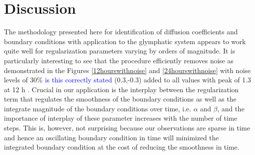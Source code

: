 \documentclass[11pt,a4paper]{article}
\newcommand{\kam}[1]{\textcolor{blue}{#1}}
\begin{document}
%
% 

\section{Discussion}

The methodology presented here for identification of diffusion coefficients and boundary conditions with application to the glymphatic system appears to work quite 
well for regularization parameters varying by orders of magnitude. It is particularly interesting to see that the procedure efficiently removes noise as demonstrated
in the Figures \ref{12hourswithnoise} and \ref{24hourswithnoise} with noise levels of 30\% \kam{is this correctly stated}{\color{red} (0.3,-0.3) added to all values with peak of 1.3 at 12 h }. 
Crucial in our application is the interplay between the regularization term that regulates the smoothness of the boundary conditions as well as
the integrate magnitude of the boundary conditions over time, i.e. $\alpha$ and $\beta$, and the
importance of interplay of these parameter increases with the number of time steps. This is, however, not surprising because our observations are sparse
in time and hence an oscillating boundary condition in time will minimized the integrated boundary condition at the cost of reducing the smoothness in time.         
\end{document}
